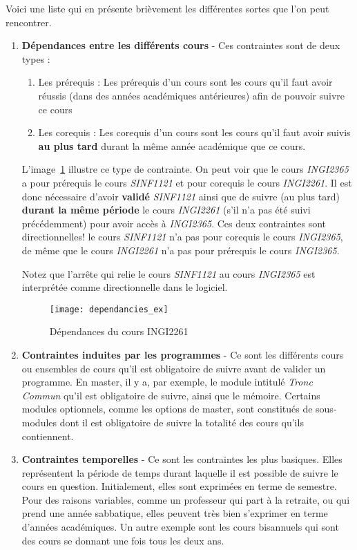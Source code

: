 Voici une liste qui en présente brièvement les différentes sortes que l'on peut rencontrer.
\begin{enumerate}
\item \textbf{Dépendances entre les différents cours} - Ces contraintes  sont de deux types :
	\begin{enumerate}
	\item Les prérequis : Les prérequis d'un cours sont les cours qu'il faut avoir réussis (dans des années académiques antérieures) afin de pouvoir suivre ce cours 
	\item Les corequis : Les corequis d'un cours sont les cours qu'il faut avoir suivis \textbf{au plus tard} durant la même année académique que ce cours.
	\end{enumerate} 

L'image~\ref{fig:cour_dep} illustre ce type de contrainte. On peut voir que le cours \textit{INGI2365} a pour prérequis le cours \textit{SINF1121} et pour corequis le cours \textit{INGI2261}. Il est donc nécessaire d'avoir \textbf{validé} \textit{SINF1121} ainsi que de suivre (au plus tard) \textbf{durant la même période} le cours \textit{INGI2261} (s'il n'a pas été suivi précédemment) pour avoir accès à \textit{INGI2365}. Ces deux contraintes sont directionnelles! le cours \textit{SINF1121} n'a pas pour corequis le cours \textit{INGI2365}, de même que le cours \textit{INGI2261} n'a pas pour prérequis le cours \textit{INGI2365}. 

Notez que l'arrête qui relie le cours \textit{SINF1121} au cours \textit{INGI2365} est interprétée comme directionnelle dans le logiciel. 

\begin{figure}[H]
\centering
\texttt{[image: dependancies\_ex]}
\caption{Dépendances du cours INGI2261}
\label{fig:cour_dep}
\end{figure}

\item \textbf{Contraintes induites par les programmes} - Ce sont les différents cours ou ensembles de cours qu'il est obligatoire de suivre avant de valider un programme. En master, il y a, par exemple, le module intitulé \textit{Tronc Commun} qu'il est obligatoire de suivre, ainsi que le mémoire. Certains modules optionnels, comme les options de master, sont constitués de sous-modules dont il est obligatoire de suivre la totalité des cours qu'ils contiennent. 

\item \textbf{Contraintes temporelles} - Ce sont les contraintes les plus basiques. Elles représentent la période de temps durant laquelle il est possible de suivre le cours en question. Initialement, elles sont exprimées en terme de semestre. Pour des raisons variables, comme un professeur qui part à la retraite, ou qui prend une année sabbatique, elles peuvent très bien s'exprimer en terme d'années académiques. Un autre exemple sont les cours bisannuels qui sont des cours se donnant une fois tous les deux ans. 


\end{enumerate}
